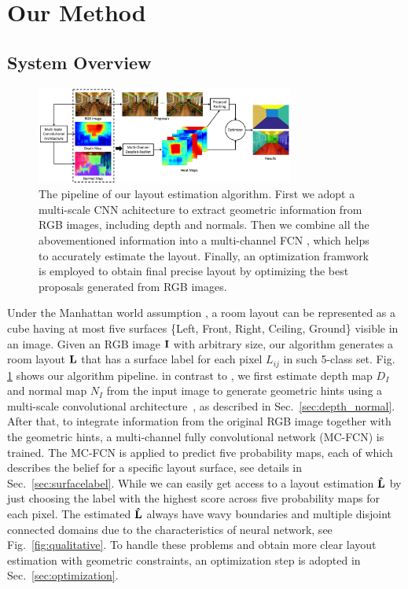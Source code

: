 \section{Our Method}
\label{sec:Meth}


\subsection{System Overview}
\label{subsection:overview}

\begin{figure}[!ht]
	\centering
	\includegraphics[width=8.5cm]{figure/ppline.png}
	\caption{The pipeline of our layout estimation algorithm. First we adopt a multi-scale CNN achitecture \cite{eigen2015predicting} to extract geometric information from RGB images, including depth and normals. Then we combine all the abovementioned information into a multi-channel FCN , which helps to accurately estimate the layout. Finally, an optimization framwork is employed to obtain final precise layout by optimizing the best proposals generated from RGB images.}
	\label{fig:pipeline}
\end{figure}

Under the Manhattan world assumption \cite{coughlan1999manhattan}, a room layout can be represented as a cube having at most five surfaces \{Left, Front, Right, Ceiling, Ground\} visible in an image. 
%
Given an RGB image $\mathbf{I}$ with arbitrary size, our algorithm generates a room layout $\mathbf{L}$ that has a surface label for each pixel $L_{ij} $ in such 5-class set. Fig. \ref{fig:pipeline} shows our algorithm pipeline. 
in contrast to \cite{dasgupta2016delay,ren2016coarse}, we first estimate depth map $D_{I}$ and normal map $N_{I}$ from the input image to generate geometric hints using a multi-scale convolutional architecture~\cite{eigen2015predicting}, as described in Sec.~\ref{sec:depth_normal}.
After that, to integrate information from the original RGB image together with the geometric hints, a multi-channel fully convolutional network (MC-FCN) is trained. The MC-FCN is applied to predict five probability maps, each of which describes the belief for a specific layout surface, see details in Sec.~\ref{sec:surfacelabel}.
While we can easily get access to a layout estimation $\mathbf{\hat{L}}$ by just choosing the label with the highest score across five probability maps for each pixel. 
The estimated $\mathbf{\hat{L}}$ always have wavy boundaries and multiple disjoint connected domains due to the characteristics of neural network, see Fig.~\ref{fig:qualitative}. To handle these problems and obtain more clear layout estimation with geometric constraints, an optimization step is adopted in Sec.~\ref{sec:optimization}.  
 

